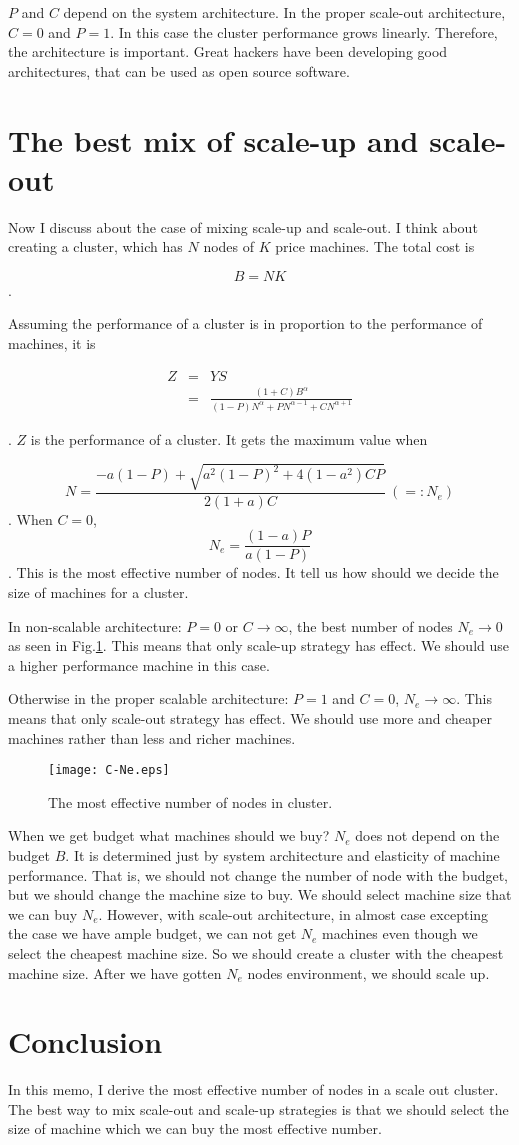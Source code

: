\documentclass[a4paper,11pt]{article}
\begin{document}
$P$ and $C$ depend on the system architecture. In the proper scale-out architecture, $C = 0$ and $P = 1$.
In this case the cluster performance grows linearly.
Therefore, the architecture is important.
Great hackers have been developing good architectures,
that can be used as open source software.

\section{The best mix of scale-up and scale-out}

Now I discuss about the case of mixing scale-up and scale-out. I think about creating a cluster, which has $N$ nodes of $K$ price machines. The total cost is 

$$
B = NK
$$
.

Assuming the performance of a cluster is in proportion to the performance of machines, it is

\begin{eqnarray*}
Z &=& YS\\
  &=&\frac{(1 + C) B^\alpha}{(1-P) N^\alpha + P N^{\alpha-1} + C N^{\alpha + 1}}
\end{eqnarray*}

. $Z$ is the performance of a cluster. It gets the maximum value when

$$
N = \frac{-a(1-P)+\sqrt{a^2(1-P)^2 + 4(1-a^2)CP}}{2(1+a)C} ~ ( =: N_e)
$$
. When $C=0$,
$$
N_e = \frac{(1-a)P}{a(1-P)}
$$
. This is the most effective number of nodes. 
It tell us how should we decide the size of machines for a cluster. 

In non-scalable architecture: $P=0$ or $C \to \infty$, the best number of nodes 
$N_e \to 0$ as seen in Fig.\ref{C-Ne}. This means that only scale-up strategy has effect. We should use a higher performance machine in this case.

Otherwise in the proper scalable architecture: $P=1$ and $C = 0$, $N_e \to \infty$.
This means that only scale-out strategy has effect.
We should use more and cheaper machines rather than less and richer machines.

\begin{figure}
\begin{center}
\texttt{[image: C-Ne.eps]}
\caption{The most effective number of nodes in cluster.}
\label{C-Ne}
\end{center}
\end{figure}

When we get budget what machines should we buy?
$N_e$ does not depend on the budget $B$.
It is determined just by system architecture and elasticity of machine performance.
That is, we should not change the number of node with the budget,
but we should change the machine size to buy.
We should select machine size that we can buy $N_e$.
However, with scale-out architecture, in almost case excepting the case we have ample budget, we can not get $N_e$ machines even though we select the cheapest machine size.
So we should create a cluster with the cheapest machine size.
After we have gotten $N_e$ nodes environment, we should scale up.

\section{Conclusion}

In this memo, I derive the most effective number of nodes in a scale out cluster. The best way to mix scale-out and scale-up strategies is that we should select the size of machine which we can buy the most effective number.
\end{document}
